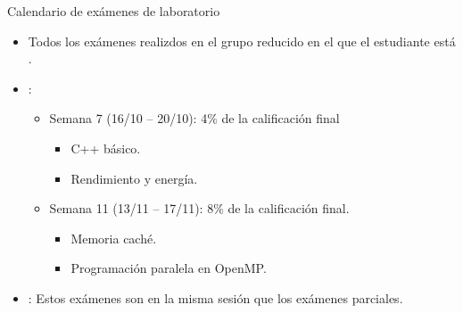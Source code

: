 \begin{frame}[t]{Calendario de exámenes de laboratorio}
\begin{itemize}
  \item Todos los exámenes realizdos en el grupo reducido
        en el que el estudiante está .

  \vfill
  \item {}:
  \begin{itemize}
    \item Semana 7 (16/10 -- 20/10): 4\% de la calificación final
      \begin{itemize}
        \item C++ básico.
        \item Rendimiento y energía.
      \end{itemize}
    \item Semana 11 (13/11 -- 17/11): 8\% de la calificación final.
      \begin{itemize}
        \item Memoria caché.
        \item Programación paralela en OpenMP.
      \end{itemize}
  \end{itemize}

  \item {}: Estos exámenes son en la misma sesión que 
        los exámenes parciales.
\end{itemize}
\end{frame}

